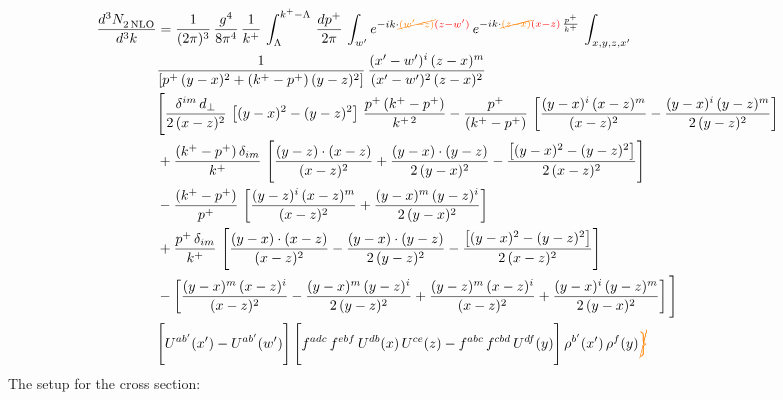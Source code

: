 \documentclass[9pt]{article}
\numberwithin{equation}{section}
\begin{document}
\begin{align}
    \frac{d^{3}N_{2\,\rm NLO}^{\rm}}{d^{3}k}  & =  \frac{1}{(2\pi)^{3}}\,\frac{g^{4}}{8\pi^{4}}\,\frac{1}{k^{+}}\,\int_{\Lambda}^{k^{+}-\Lambda}\, \frac{dp^{+}}{2\pi} \,\int_{ w^\prime} e^{-ik\cdot{\color{orange}\cancel{(w'-z)}}{\color{red}(z-w')}}\,e^{-ik\cdot {\color{orange}\cancel{(z-x)}}{\color{red}(x-z)}\,\frac{p^{+}}{k^{+}}}\, \int_{x,y,z,x'}\,\notag \\ & \frac{1}{\left[p^{+}\,(y-x)^{2}+(k^{+}-p^{+})\,(y-z)^{2}\right]}\, \frac{(x'-w')^{i}\,(z-x)^{m}}{(x'-w')^{2}\,(z-x)^{2}} \notag \\ & \Bigg[\frac{\delta^{im}\,d_{\perp}}{2\,(x-z)^{2}}\,\left[(y-x)^{2}-(y-z)^{2}\right]\,\frac{p^{+}\,(k^{+}-p^{+})}{k^{+\,2}}-\frac{p^{+}}{(k^{+}-p^{+})}\,\left[\frac{(y-x)^{i}\,(x-z)^{m}}{(x-z)^{2}}-\frac{(y-x)^{i}\,(y-z)^{m}}{2\,(y-z)^{2}}\right]\notag \\ & +\frac{(k^{+}-p^{+})\,\delta_{im}}{k^{+}}\,\left[\frac{(y-z)\cdot (x-z)}{(x-z)^{2}}+\frac{(y-x)\cdot (y-z)}{2\,(y-x)^{2}}-\frac{\left[(y-x)^{2}-(y-z)^{2}\right]}{2\,(x-z)^{2}}\right]\notag \\ & -\frac{(k^{+}-p^{+})}{p^{+}}\,\left[\frac{(y-z)^{i}\,(x-z)^{m}}{(x-z)^{2}}+\frac{(y-x)^{m}\,(y-z)^{i}}{2\,(y-x)^{2}}\right]\notag \\ & +\frac{p^{+}\,\delta_{im}}{k^{+}}\,\left[\frac{(y-x)\cdot (x-z)}{(x-z)^{2}}-\frac{(y-x)\cdot (y-z)}{2\,(y-z)^{2}}-\frac{\left[(y-x)^{2}-(y-z)^{2}\right]}{2\,(x-z)^{2}}\right]\notag \\ &-\left[\frac{(y-x)^{m}\,(x-z)^{i}}{(x-z)^{2}}-\frac{(y-x)^{m}\,(y-z)^{i}}{2\,(y-z)^{2}}+\frac{(y-z)^{m}\,(x-z)^{i}}{(x-z)^{2}}+\frac{(y-x)^{i}\,(y-z)^{m}}{2\,(y-x)^{2}}\right]\Bigg] \notag \\ & \Bigg[U^{ab'}(x')-U^{ab'}(w')\Bigg]\,\Bigg[f^{adc}\,f^{ebf}\,U^{db}(x)\,U^{ce}(z)-f^{abc}\,f^{cbd}\,U^{df}(y)\Bigg]\,\rho^{b'}(x')\,\rho^{f}(y){\color{orange}\cancel{\Big\}}}
\end{align}
The setup for the cross section: 
\end{document}
